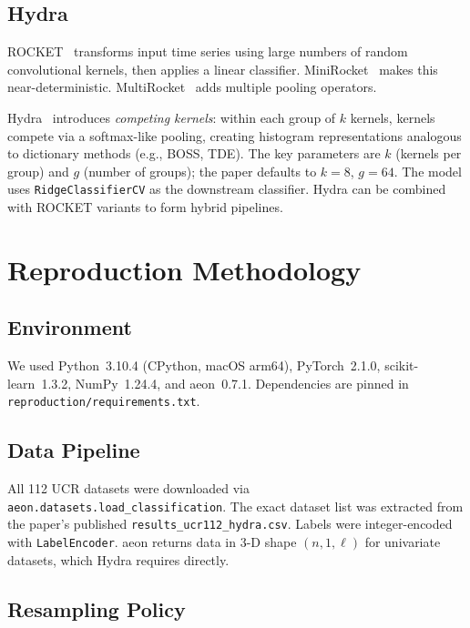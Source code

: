 \documentclass[conference]{IEEEtran}
\begin{document}
\subsection{Hydra}

ROCKET~\cite{rocket2020} transforms input time series using large numbers
of random convolutional kernels, then applies a linear classifier.
MiniRocket~\cite{minirocket2021} makes this near-deterministic.
MultiRocket~\cite{multirocket2022} adds multiple pooling operators.

Hydra~\cite{hydra2023} introduces \emph{competing kernels}: within each
group of $k$ kernels, kernels compete via a softmax-like pooling, creating
histogram representations analogous to dictionary methods (e.g., BOSS,
TDE). The key parameters are $k$ (kernels per group) and $g$ (number of
groups); the paper defaults to $k{=}8$, $g{=}64$. The model uses
\texttt{RidgeClassifierCV} as the downstream classifier. Hydra can be
combined with ROCKET variants to form hybrid pipelines.

\section{Reproduction Methodology}

\subsection{Environment}

We used Python~3.10.4 (CPython, macOS arm64), PyTorch~2.1.0,
scikit-learn~1.3.2, NumPy~1.24.4, and aeon~0.7.1. Dependencies are
pinned in \texttt{reproduction/requirements.txt}.

\subsection{Data Pipeline}

All 112 UCR datasets were downloaded via \texttt{aeon.datasets.load\_classification}.
The exact dataset list was extracted from the paper's published
\texttt{results\_ucr112\_hydra.csv}. Labels were integer-encoded with
\texttt{LabelEncoder}. aeon returns data in 3-D shape
$(n, 1, \ell)$ for univariate datasets, which Hydra requires directly.

\subsection{Resampling Policy}
\end{document}
